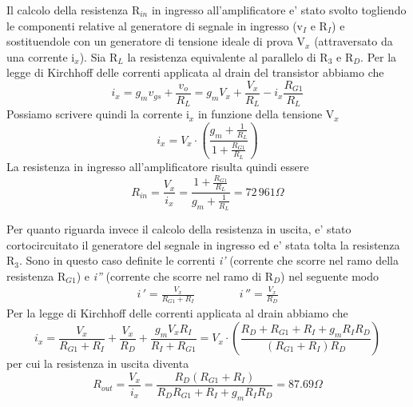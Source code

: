 \documentclass[a4paper,10pt]{article}
\begin{document}
Il calcolo della resistenza R$_{in}$ in ingresso all'amplificatore e' stato svolto togliendo le componenti relative al generatore di segnale in ingresso (v$_I$ e R$_I$) e sostituendole con un generatore di tensione ideale di prova V$_x$ (attraversato da una corrente i$_x$). Sia R$_L$ la resistenza equivalente al parallelo di R$_3$ e R$_D$.
Per la legge di Kirchhoff delle correnti applicata al drain del transistor abbiamo che
\begin{equation*}
i_x = g_mv_{gs} + \frac{v_o}{R_L} = g_mV_x+ \frac{V_x}{R_L} - i_x\frac{R_{G1}}{R_L}
\end{equation*}
Possiamo scrivere quindi la corrente i$_x$ in funzione della tensione V$_x$
\begin{equation*}
i_x = V_x \cdot \left( \frac{g_m+\frac{1}{R_L}}{1+\frac{R_{G1}}{R_L}} \right)
\end{equation*}
La resistenza in ingresso all'amplificatore risulta quindi essere
\begin{equation*}
R_{in} = \frac{V_x}{i_x} = \frac{1+\frac{R_{G1}}{R_L}}{g_m + \frac{1}{R_L}} = 72\,961\Omega
\end{equation*}

Per quanto riguarda invece il calcolo della resistenza in uscita, e' stato cortocircuitato il generatore del segnale in ingresso ed e' stata tolta la resistenza R$_3$. Sono in questo caso definite le correnti \textit{i'} (corrente che scorre nel ramo della resistenza R$_{G1}$) e \textit{i''} (corrente che scorre nel ramo di R$_D$) nel seguente modo
\begin{gather*}
i\,' = \frac{V_x}{R_{G1}+R_I}  \qquad \qquad i\,''=\frac{V_x}{R_D}
\end{gather*}
Per la legge di Kirchhoff delle correnti applicata al drain abbiamo che 
\begin{equation*}
i_x = \frac{V_x}{R_{G1}+R_I} +  \frac{V_x}{R_D} + \frac{g_mV_xR_I}{R_I+R_{G1}} = V_x \cdot \left( \frac{R_D+R_{G1}+R_I+g_mR_IR_D}{(R_{G1}+R_I)R_D} \right)
\end{equation*}
per cui la resistenza in uscita diventa
\begin{equation*}
R_{out} = \frac{V_x}{i_x} = \frac{R_D(R_{G1}+R_I)}{R_DR_{G1}+R_I+g_mR_IR_D} = 87.69\Omega
\end{equation*}

\newpage
\end{document}
